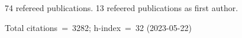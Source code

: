 74 refereed publications. 13 refeered publications as first author.

Total citations~=~3282; h-index~=~32 (2023-05-22)